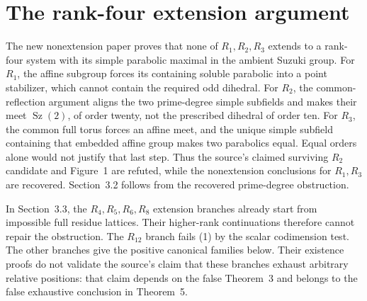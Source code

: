 \documentclass[11pt,a4paper]{article}
\newcommand{\Sz}{\operatorname{Sz}}
\begin{document}
\section{The rank-four extension argument}
The new nonextension paper proves that none of $R_1,R_2,R_3$ extends
to a rank-four system with its simple parabolic maximal in the ambient
Suzuki group. For $R_1$, the affine subgroup forces its containing
soluble parabolic into a point stabilizer, which cannot contain the
required odd dihedral. For $R_2$, the common-reflection argument aligns
the two prime-degree simple subfields and makes their meet $\Sz(2)$,
of order twenty, not the prescribed dihedral of order ten.
For $R_3$, the common full torus forces an affine meet, and the unique
simple subfield containing that embedded affine group makes two
parabolics equal. Equal orders alone would not justify that last step.
Thus the source's claimed surviving $R_2$ candidate and Figure~1 are
refuted, while the nonextension conclusions for $R_1,R_3$ are recovered.
Section~3.2 follows from the recovered prime-degree obstruction.

In Section~3.3, the $R_4,R_5,R_6,R_8$ extension branches already start
from impossible full residue lattices. Their higher-rank continuations
therefore cannot repair the obstruction. The $R_{12}$ branch fails (1)
by the scalar codimension test. The other branches give the positive
canonical families below. Their existence proofs do not validate the
source's claim that these branches exhaust arbitrary relative positions:
that claim depends on the false Theorem~3 and belongs to the false
exhaustive conclusion in Theorem~5.
\end{document}

